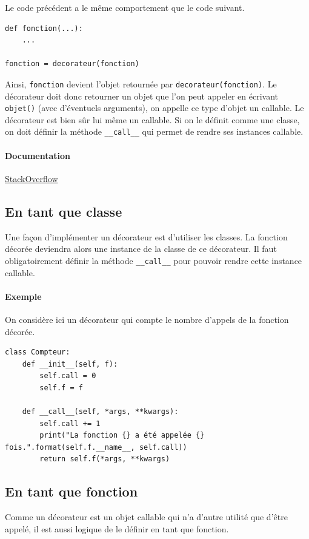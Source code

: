 \documentclass[a4paper, 10pt]{article}
\newcommand{\code}[1]{{\small\texttt{#1}}}
\begin{document}
Le code précédent a le même comportement que le code suivant.

\begin{verbatim}
def fonction(...):
    ...

fonction = decorateur(fonction)
\end{verbatim}

Ainsi, \code{fonction} devient l'objet retournée par \code{decorateur(fonction)}. Le décorateur doit donc retourner un objet que l'on peut appeler en écrivant \code{objet()} (avec d'éventuels arguments), on appelle ce type d'objet un \og callable\fg{}. Le décorateur est bien sûr lui même un callable. Si on le définit comme une classe, on doit définir la méthode \code{\_\_call\_\_} qui permet de rendre ses instances callable.

\paragraph{Documentation} \href{https://stackoverflow.com/questions/739654/how-to-make-a-chain-of-function-decorators/1594484#1594484}{StackOverflow}

\subsection{En tant que classe}
Une façon d'implémenter un décorateur est d'utiliser les classes. La fonction décorée deviendra alors une instance de la classe de ce décorateur. Il faut obligatoirement définir la méthode \code{\_\_call\_\_} pour pouvoir rendre cette instance callable.

\paragraph{Exemple} On considère ici un décorateur qui compte le nombre d'appels de la fonction décorée.
\begin{verbatim}
class Compteur:
    def __init__(self, f):
        self.call = 0
        self.f = f

    def __call__(self, *args, **kwargs):
        self.call += 1
        print("La fonction {} a été appelée {} fois.".format(self.f.__name__, self.call))
        return self.f(*args, **kwargs)
\end{verbatim}
\subsection{En tant que fonction}
Comme un décorateur est un objet callable qui n'a d'autre utilité que d'être appelé, il est aussi logique de le définir en tant que fonction.
\end{document}

